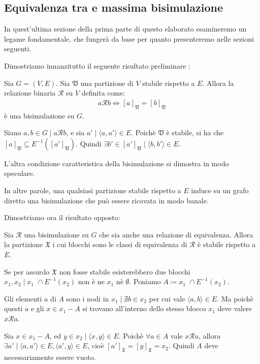 \subsection{Equivalenza tra \rscp e massima bisimulazione}
\label{sec:bisi_and_rscp}
In quest'ultima sezione della prima parte di questo elaborato esamineremo un legame fondamentale, che fungerà da base per quanto presenteremo nelle sezioni seguenti.

Dimostriamo innanzitutto il seguente risultato preliminare \cite{gentilini}:
\begin{proposition}
    Sia $G = (V,E)$. Sia $\mathfrak{V}$ una partizione di $V$ stabile rispetto a $E$. Allora la relazione binaria $\mathcal{R}$ su $V$ definita come:
    \begin{gather*}
        a \mathcal{R} b \iff [a]_\mathfrak{V} = [b]_\mathfrak{V}
    \end{gather*}
    è una bisimulazione su $G$.
    \label{prop:part_induce_bisi}
\end{proposition}
\begin{proof2}
    Siano $a,b \in G \mid a \mathcal{R} b$, e sia $a' \mid \langle a, a' \rangle \in E$. Poichè $\mathfrak{V}$ è stabile, si ha che $[a]_\mathfrak{V} \subseteq E^{-1}([a']_\mathfrak{V})$. Quindi $\exists b' \in [a']_\mathfrak{V} \mid \langle b, b' \rangle \in E$.

    L'altra condizione caratteristica della bisimulazione si dimostra in modo speculare.
\end{proof2}
In altre parole, una qualsiasi partizione stabile rispetto a $E$ induce su un grafo diretto una bisimulazione che può essere ricavata in modo banale.

Dimostriamo ora il risultato opposto:
\begin{proposition}
    Sia $\mathcal{R}$ una bisimulazione su $G$ che sia anche una relazione di equivalenza. Allora la partizione $\mathfrak{X}$ i cui blocchi sono le classi di equivalenza di $\mathcal{R}$ è stabile rispetto a $E$.
    \label{prop:bisi_induce_part}
\end{proposition}
\begin{proof2}
    Se per assurdo $\mathfrak{X}$ non fosse stabile esisterebbero due blocchi $x_1, x_2 \mid x_1 \,\,\cap E^{-1}(x_2)$ non è ne $x_1$ nè $\emptyset$. Poniamo $A \coloneqq x_1 \,\,\cap E^{-1}(x_2)$.

    Gli elementi $a$ di $A$ sono i nodi in $x_1 \mid \nexists b \in x_2$ per cui vale $\langle a, b \rangle \in E$. Ma poichè questi $a$ e gli $x \in x_1 - A$ si trovano all'interno dello stesso blocco $x_1$ deve valere $x \mathcal{R} a$.

    Sia $x \in x_1 - A$, ed $y \in x_2 \mid \langle x, y \rangle \in E$. Poichè $\forall a \in A$ vale $x \mathcal{R} a$, allora $\exists a' \mid \langle a, a' \rangle \in E, \langle a', y \rangle \in E$, cioè $[a']_\mathfrak{X} = [y]_\mathfrak{X} = x_2$. Quindi $A$ deve necessariamente essere vuoto.
\end{proof2}

